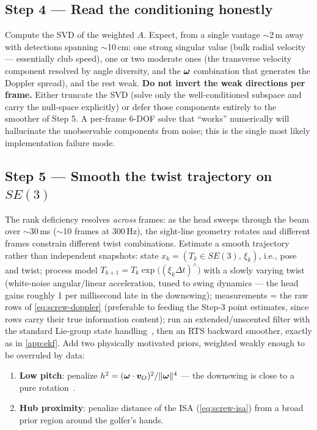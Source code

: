 \subsection*{Step 4 --- Read the conditioning honestly}
Compute the SVD of the weighted $A$.
Expect, from a single vantage $\sim$2\,m away with detections spanning $\sim$10\,cm: one strong singular value (bulk radial velocity --- essentially club speed), one or two moderate ones (the transverse velocity component resolved by angle diversity, and the $\bm{\omega}$ combination that generates the Doppler spread), and the rest weak.
\textbf{Do not invert the weak directions per frame.}
Either truncate the SVD (solve only the well-conditioned subspace and carry the null-space explicitly) or defer those components entirely to the smoother of Step 5.
A per-frame 6-DOF solve that ``works'' numerically will hallucinate the unobservable components from noise; this is the single most likely implementation failure mode.

\subsection*{Step 5 --- Smooth the twist trajectory on $SE(3)$}
The rank deficiency resolves \emph{across} frames: as the head sweeps through the beam over $\sim$30\,ms ($\sim$10 frames at 300\,Hz), the sight-line geometry rotates and different frames constrain different twist combinations.
Estimate a smooth trajectory rather than independent snapshots:
state $x_k = (T_k \in SE(3),\, \xi_k)$, i.e., pose and twist;
process model $T_{k+1} = T_k \exp\!\bigl((\xi_k \Delta t)^{\wedge}\bigr)$ with a slowly varying twist (white-noise angular/linear acceleration, tuned to swing dynamics --- the head gains roughly 1\mph{} per millisecond late in the downswing);
measurements = the raw rows of \cref{eq:screw-doppler} (preferable to feeding the Step-3 point estimates, since rows carry their true information content);
run an extended/unscented filter with the standard Lie-group state handling~\cite{murrayliss}, then an RTS backward smoother, exactly as in \cref{app:ekf}.
Add two physically motivated priors, weighted weakly enough to be overruled by data:
\begin{enumerate}
\item \textbf{Low pitch}: penalize $h^2 = (\bm{\omega}\cdot\bm{v}_O)^2/\lVert\bm{\omega}\rVert^4$ --- the downswing is close to a pure rotation~\cite{vena2010a}.
\item \textbf{Hub proximity}: penalize distance of the ISA (\cref{eq:screw-isa}) from a broad prior region around the golfer's hands.
\end{enumerate}

